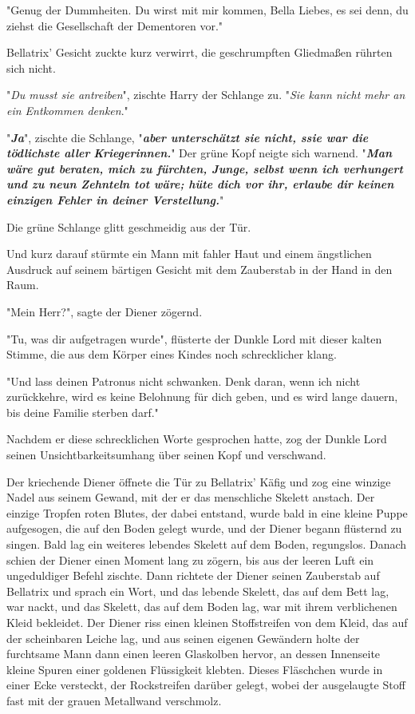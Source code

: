 {"Genug der Dummheiten. Du wirst mit mir kommen, Bella Liebes, es sei denn, du ziehst die Gesellschaft der Dementoren vor."

Bellatrix' Gesicht zuckte kurz verwirrt, die geschrumpften Gliedmaßen rührten sich nicht.

"\emph{Du musst sie antreiben}", zischte Harry der Schlange zu. "\emph{Sie kann nicht mehr an ein Entkommen denken}."

"\textbf{\emph{Ja}}", zischte die Schlange, "\textbf{\emph{aber unterschätzt sie nicht, ssie war die tödlichste aller}} \textbf{\emph{Kriegerinnen.}}" Der grüne Kopf neigte sich warnend. "\textbf{\emph{Man wäre gut beraten, mich zu fürchten, Junge, selbst wenn ich verhungert und zu neun Zehnteln tot wäre; hüte dich vor ihr, erlaube dir keinen einzigen Fehler in deiner Verstellung.}}"

Die grüne Schlange glitt geschmeidig aus der Tür.

Und kurz darauf stürmte ein Mann mit fahler Haut und einem ängstlichen Ausdruck auf seinem bärtigen Gesicht mit dem Zauberstab in der Hand in den Raum.

"Mein Herr?", sagte der Diener zögernd.

"Tu, was dir aufgetragen wurde", flüsterte der Dunkle Lord mit dieser kalten Stimme, die aus dem Körper eines Kindes noch schrecklicher klang.

"Und lass deinen Patronus nicht schwanken. Denk daran, wenn ich nicht zurückkehre, wird es keine Belohnung für dich geben, und es wird lange dauern, bis deine Familie sterben darf."

Nachdem er diese schrecklichen Worte gesprochen hatte, zog der Dunkle Lord seinen Unsichtbarkeitsumhang über seinen Kopf und verschwand.

Der kriechende Diener öffnete die Tür zu Bellatrix' Käfig und zog eine winzige Nadel aus seinem Gewand, mit der er das menschliche Skelett anstach. Der einzige Tropfen roten Blutes, der dabei entstand, wurde bald in eine kleine Puppe aufgesogen, die auf den Boden gelegt wurde, und der Diener begann flüsternd zu singen. Bald lag ein weiteres lebendes Skelett auf dem Boden, regungslos. Danach schien der Diener einen Moment lang zu zögern, bis aus der leeren Luft ein ungeduldiger Befehl zischte. Dann richtete der Diener seinen Zauberstab auf Bellatrix und sprach ein Wort, und das lebende Skelett, das auf dem Bett lag, war nackt, und das Skelett, das auf dem Boden lag, war mit ihrem verblichenen Kleid bekleidet. Der Diener riss einen kleinen Stoffstreifen von dem Kleid, das auf der scheinbaren Leiche lag, und aus seinen eigenen Gewändern holte der furchtsame Mann dann einen leeren Glaskolben hervor, an dessen Innenseite kleine Spuren einer goldenen Flüssigkeit klebten. Dieses Fläschchen wurde in einer Ecke versteckt, der Rockstreifen darüber gelegt, wobei der ausgelaugte Stoff fast mit der grauen Metallwand verschmolz.

}
